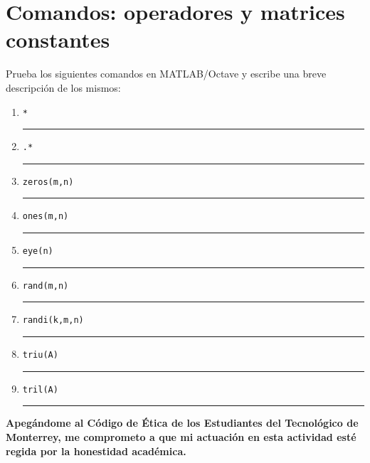 \documentclass[spanish, 10pt]{article}
\newcommand{\responserule}{{\large\rule{14 cm}{0.3mm}}}
\newcommand{\matlab}[1]{\lstinline[style=Matlab-pyglike]!#1!}
\begin{document}
\pagebreak

\section{Comandos: operadores y matrices constantes}

Prueba los siguientes comandos en MATLAB/Octave y escribe una breve descripción de los mismos:

\begin{enumerate}[label=\alph*)]
	\large
	\item \matlab{*} \\[3ex] \responserule
	\item \matlab{.*} \\[3ex] \responserule
	\item \matlab{zeros(m,n)} \\[3ex] \responserule
	\item \matlab{ones(m,n)} \\[3ex] \responserule
	\item \matlab{eye(n)} \\[3ex] \responserule
	\item \matlab{rand(m,n)} \\[3ex] \responserule
	\item \matlab{randi(k,m,n)} \\[3ex] \responserule
	\item \matlab{triu(A)} \\[3ex] \responserule
	\item \matlab{tril(A)} \\[3ex] \responserule
\end{enumerate}

\vfill

\textbf{Apegándome al Código de Ética de los Estudiantes del Tecnológico de Monterrey, me comprometo a que mi actuación en esta actividad esté regida por la honestidad académica.}
\end{document}
